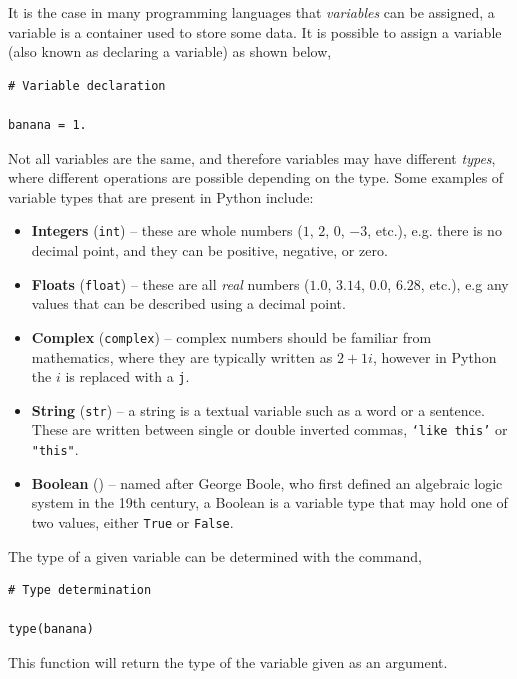 \documentclass[a4paper]{article}
\begin{document}
It is the case in many programming languages that \emph{variables} can be assigned, a variable is a container used to store some data. 
It is possible to assign a variable (also known as declaring a variable) as shown below,
\begin{lstlisting}
# Variable declaration

banana = 1.
\end{lstlisting}
Not all variables are the same, and therefore variables may have different \emph{types}, where different operations are possible depending on the type.
Some examples of variable types that are present in Python include: 
\begin{itemize}
	\item{\textbf{Integers} (\texttt{int}) -- these are whole numbers ($1$, $2$, $0$, $-3$, etc.), e.g. there is no decimal point, and they can be positive, negative, or zero.}
	\item{\textbf{Floats} (\texttt{float}) -- these are all \emph{real} numbers ($1.0$, $3.14$, $0.0$, $6.28$, etc.), e.g any values that can be described using a decimal point.}
	\item{\textbf{Complex} (\texttt{complex}) -- complex numbers should be familiar from mathematics, where they are typically written as $2+1i$, however in Python the $i$ is replaced with a \texttt{j}.}
	\item{\textbf{String} (\texttt{str}) -- a string is a textual variable such as a word or a sentence. These are written between single or double inverted commas, \texttt{`like this'} or \texttt{"this"}.}
	\item{\textbf{Boolean} () -- named after George Boole, who first defined an algebraic logic system in the 19th century, a Boolean is a variable type that may hold one of two values, either \texttt{True} or \texttt{False}.} 
\end{itemize}
The type of a given variable can be determined with the command, 
\begin{lstlisting}
# Type determination

type(banana)
\end{lstlisting}
This function will return the type of the variable given as an argument. 
\end{document}
